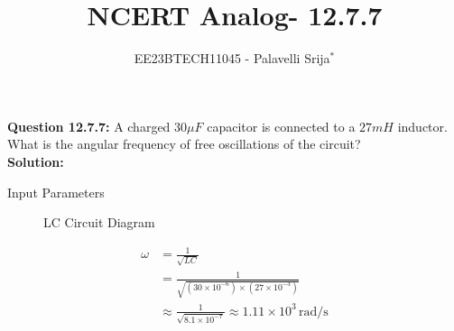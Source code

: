 \documentclass[journal,12pt,twocolumn]{IEEEtran}
\theoremstyle{remark}
\begin{document}

\vspace{3cm}

\title{NCERT Analog- 12.7.7}
\author{EE23BTECH11045 - Palavelli Srija$^{*}$}

\maketitle

\bigskip

\renewcommand{\thefigure}{\theenumi}
\renewcommand{\thetable}{\theenumi}

\vspace{3cm}
\textbf{Question 12.7.7:} 
 A charged $30 \mu F$ capacitor is connected to a $27 mH$ inductor. What is the angular frequency of free oscillations of the circuit?\\
\textbf{Solution: }
\begin{table}[h!]
    \centering
    
    \caption{Input Parameters}
    \label{tab:table_omega}
\end{table}
\begin{figure}[H]
    \centering
    
    \caption{LC Circuit Diagram}
    \label{fig:omega2}
\end{figure}
\begin{align}
\omega &= \frac{1}{\sqrt{LC}} \\
&= \frac{1}{\sqrt{(30 \times 10^{-6}) \times (27 \times 10^{-3})}} \\
&\approx \frac{1}{\sqrt{8.1 \times 10^{-7}}} \approx 1.11 \times 10^{3} \, \text{rad/s}
\end{align}
\end{document}
